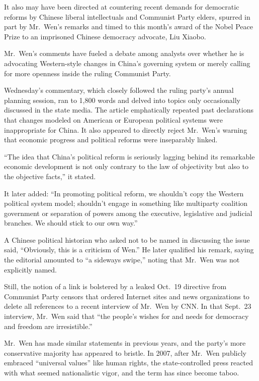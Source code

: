 ﻿\documentclass[12pt]{article}
\begin{document}
It also may have been directed at countering recent demands for democratic reforms by Chinese
liberal intellectuals and Communist Party elders, spurred in part by Mr.~Wen's remarks and timed to
this month's award of the Nobel Peace Prize to an imprisoned Chinese democracy advocate, Liu Xiaobo.

Mr.~Wen's comments have fueled a debate among analysts over whether he is advocating Western-style
changes in China's governing system or merely calling for more openness inside the ruling Communist
Party.

Wednesday's commentary, which closely followed the ruling party's annual planning session, ran to
1,800 words and delved into topics only occasionally discussed in the state media. The article
emphatically repeated past declarations that changes modeled on American or European political
systems were inappropriate for China. It also appeared to directly reject Mr.~Wen's warning that
economic progress and political reforms were inseparably linked.

``The idea that China's political reform is seriously lagging behind its remarkable economic
development is not only contrary to the law of objectivity but also to the objective facts,'' it
stated.

It later added: ``In promoting political reform, we shouldn't copy the Western political system
model; shouldn't engage in something like multiparty coalition government or separation of powers
among the executive, legislative and judicial branches. We should stick to our own way.''

A Chinese political historian who asked not to be named in discussing the issue said, ``Obviously,
this is a criticism of Wen.'' He later qualified his remark, saying the editorial amounted to ``a
sideways swipe,'' noting that Mr.~Wen was not explicitly named.

Still, the notion of a link is bolstered by a leaked Oct.~19 directive from Communist Party censors
that ordered Internet sites and news organizations to delete all references to a recent interview of
Mr.~Wen by CNN. In that Sept.~23 interview, Mr.~Wen said that ``the people's wishes for and needs
for democracy and freedom are irresistible.''

Mr.~Wen has made similar statements in previous years, and the party's more conservative majority
has appeared to bristle. In 2007, after Mr.~Wen publicly embraced ``universal values'' like human
rights, the state-controlled press reacted with what seemed nationalistic vigor, and the term has
since become taboo.
\end{document}
